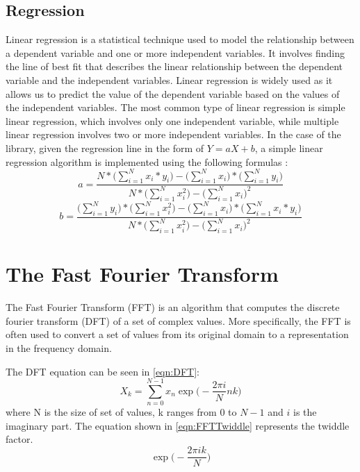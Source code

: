 \documentclass{book}
\begin{document}
\subsection{Regression}

Linear regression is a statistical technique used to model the relationship between a dependent variable and one or more independent variables. It involves finding the line of best fit that describes the linear relationship between the dependent variable and the independent variables. Linear regression is widely used as it allows us to predict the value of the dependent variable based on the values of the independent variables. The most common type of linear regression is simple linear regression, which involves only one independent variable, while multiple linear regression involves two or more independent variables. In the case of the library, given the regression line in the form of $Y = aX + b$, a simple linear regression algorithm is implemented using the following formulas :
\begin{equation}
    a = \frac{N * \Big(\sum_{i=1}^{N} x_i * y_i\Big) - \Big(\sum_{i=1}^{N} x_i\Big) * \Big(\sum_{i=1}^{N} y_i\Big)}{N * \Big(\sum_{i=1}^{N} x_i^2\Big) - \Big(\sum_{i=1}^{N} x_i\Big)^2}
\end{equation}
\begin{equation}
    b = \frac{\Big(\sum_{i=1}^{N} y_i\Big) * \Big(\sum_{i=1}^{N} x_i^2\Big) - \Big(\sum_{i=1}^{N} x_i\Big) * \Big(\sum_{i=1}^{N} x_i * y_i\Big)}{N * \Big(\sum_{i=1}^{N} x_i^2\Big) - \Big(\sum_{i=1}^{N} x_i\Big)^2}
\end{equation}

\section{The Fast Fourier Transform}


The Fast Fourier Transform (FFT) is an algorithm that computes the discrete fourier transform (DFT) of a set of complex values. More specifically, the FFT is often used to convert a set of values from its original domain to a representation in the frequency domain.

The DFT equation can be seen in \ref{eqn:DFT}:
\begin{equation}
	X_k = \sum_{n=0}^{N-1} x_n \exp \biggl(- \frac{2 \pi i}{N} nk \biggr)
	\label{eqn:DFT}
\end{equation}
where N is the size of set of values, k ranges from 0 to $N-1$ and $i$ is the imaginary part. The equation shown in \ref{eqn:FFTTwiddle} represents the twiddle factor.
\begin{equation}
	\exp \biggl( - \frac{2 \pi i k}{N} \biggr)
	\label{eqn:FFTTwiddle}
\end{equation}
\end{document}

